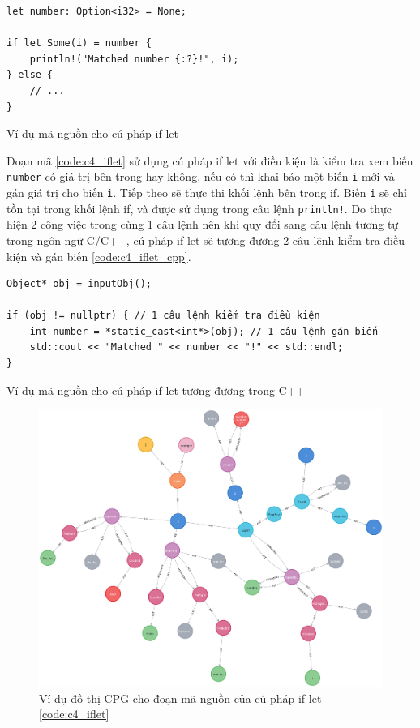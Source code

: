 \begin{listing}[H]
\begin{verbatim}
let number: Option<i32> = None;

if let Some(i) = number {
    println!("Matched number {:?}!", i);
} else {
    // ...
}
\end{verbatim}
\caption{Ví dụ mã nguồn cho cú pháp if let}
\label{code:c4_iflet}
\end{listing}

Đoạn mã \ref{code:c4_iflet} sử dụng cú pháp if let với điều kiện là kiểm tra xem biến \texttt{number} có giá trị bên trong hay không, nếu có thì khai báo một biến \texttt{i} mới và gán giá trị cho biến \texttt{i}.
Tiếp theo sẽ thực thi khối lệnh bên trong if.
Biến \texttt{i} sẽ chỉ tồn tại trong khối lệnh if, và được sử dụng trong câu lệnh \texttt{println!}.
Do thực hiện 2 công việc trong cùng 1 câu lệnh nên khi quy đổi sang câu lệnh tương tự trong ngôn ngữ C/C++, cú pháp if let sẽ tương đương 2 câu lệnh kiểm tra điều kiện và gán biến \ref{code:c4_iflet_cpp}.

\begin{listing}[H]
\begin{verbatim}
Object* obj = inputObj();

if (obj != nullptr) { // 1 câu lệnh kiểm tra điều kiện
    int number = *static_cast<int*>(obj); // 1 câu lệnh gán biến
    std::cout << "Matched " << number << "!" << std::endl;
}
\end{verbatim}
\caption{Ví dụ mã nguồn cho cú pháp if let tương đương trong C++}
\label{code:c4_iflet_cpp}
\end{listing}

\begin{figure}[H]
\includegraphics[width=1\columnwidth]{figures/c4/c4_iflet.png}
\centering
\caption{Ví dụ đồ thị CPG cho đoạn mã nguồn của cú pháp if let \ref{code:c4_iflet}}
\label{img:c4_cpg_iflet}
\end{figure}

